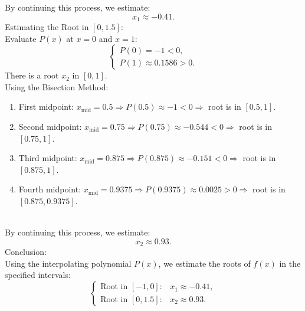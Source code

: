 \documentclass{article}
\begin{document}
By continuing this process, we estimate:
\[
    x_1 \approx -0.41.
\]
Estimating the Root in \([0, 1.5]\):
\\
Evaluate \( P(x) \) at \( x = 0 \) and \( x = 1 \):
\[
\begin{cases}
P(0) = -1 < 0, \\
P(1) \approx 0.1586 > 0.
\end{cases}
\]
There is a root \( x_2 \) in \([0, 1]\).
\\
Using the Bisection Method:
\begin{enumerate}
    \item First midpoint: \( x_{\text{mid}} = 0.5 \Rightarrow P(0.5) \approx -1 < 0 \Rightarrow \) root is in \([0.5, 1]\).
    \item Second midpoint: \( x_{\text{mid}} = 0.75 \Rightarrow P(0.75) \approx -0.544 < 0 \Rightarrow \) root is in \([0.75, 1]\).
    \item Third midpoint: \( x_{\text{mid}} = 0.875 \Rightarrow P(0.875) \approx -0.151 < 0 \Rightarrow \) root is in \([0.875, 1]\).
    \item Fourth midpoint: \( x_{\text{mid}} = 0.9375 \Rightarrow P(0.9375) \approx 0.0025 > 0 \Rightarrow \) root is in \([0.875, 0.9375]\).
\end{enumerate}
\\
By continuing this process, we estimate:
\[
    x_2 \approx 0.93.
\]
Conclusion:
\\
Using the interpolating polynomial \( P(x) \), we estimate the roots of \( f(x) \) in the specified intervals:
\[
\begin{cases}
\text{Root in } [-1, 0]: & x_1 \approx -0.41, \\
\text{Root in } [0, 1.5]: & x_2 \approx 0.93.
\end{cases}
\]
\end{document}
